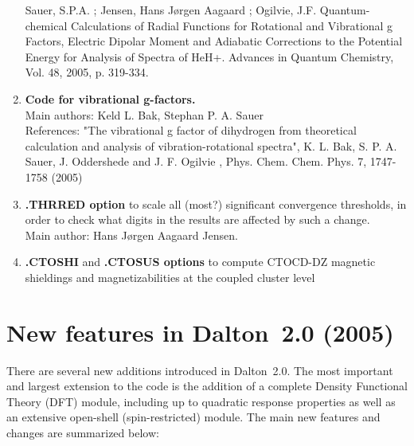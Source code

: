 \begin{enumerate}
Sauer, S.P.A. ; Jensen, Hans J\o rgen Aagaard ; Ogilvie, J.F.
Quantum-chemical Calculations of Radial Functions for Rotational and
Vibrational g Factors, Electric Dipolar Moment and Adiabatic Corrections
to the Potential Energy for Analysis of Spectra of HeH+.
Advances in Quantum Chemistry, Vol. 48, 2005, p. 319-334.


\item{\bf Code for vibrational g-factors.}  \\
Main authors: Keld L. Bak, Stephan P. A. Sauer\\
   References: "The vibrational g factor of dihydrogen from theoretical calculation
   and analysis of vibration-rotational spectra", K. L. Bak, S. P. A. Sauer, J. Oddershede and J. F. Ogilvie ,
   Phys. Chem. Chem. Phys. 7, 1747-1758 (2005)

\item{\bf .THRRED option} to scale all (most?) significant
convergence thresholds, in order to check what digits in the results are
affected by such a change.\\
Main author: Hans J\o rgen Aagaard Jensen.

\item{\bf .CTOSHI} and {\bf .CTOSUS options} to compute CTOCD-DZ magnetic
shieldings and magnetizabilities at the coupled cluster level

\end{enumerate}

\section{New features in Dalton~2.0 (2005)}

There are several new additions introduced in Dalton~2.0. The most
important and largest extension to the code is the addition of a
complete Density Functional Theory (DFT) module, including up to quadratic
response properties as well as an extensive open-shell
(spin-restricted) module. The main new features and changes are
summarized below:

